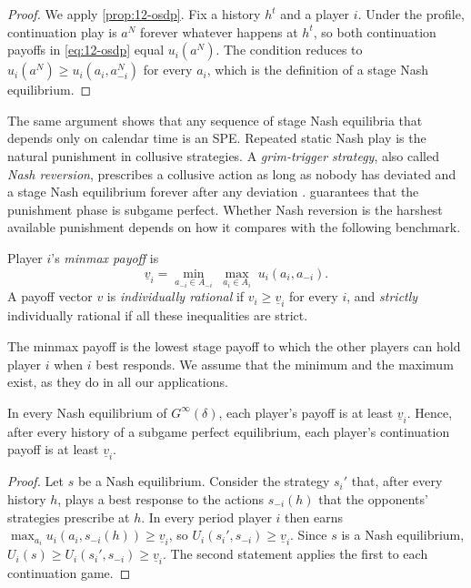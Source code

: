 \begin{proof}
We apply \cref{prop:12-osdp}. Fix a history $h^t$ and a player $i$. Under the profile, continuation play is $a^N$
forever whatever happens at $h^t$, so both continuation payoffs in \eqref{eq:12-osdp} equal $u_i(a^N)$. The condition
reduces to $u_i(a^N) \ge u_i(a_i, a_{-i}^N)$ for every $a_i$, which is the definition of a stage Nash equilibrium.
\end{proof}

The same argument shows that any sequence of stage Nash equilibria that depends only on calendar time is an SPE.
Repeated static Nash play is the natural punishment in collusive strategies. A \emph{grim-trigger strategy}, also
called \emph{Nash reversion}, prescribes a collusive action as long as nobody has deviated and a stage Nash
equilibrium forever after any deviation \citep{Friedman1971}.  guarantees that the
punishment phase is subgame perfect. Whether Nash reversion is the harshest available punishment depends on how it
compares with the following benchmark.

\begin{definition}\label{def:12-minmax}
Player $i$'s \emph{minmax payoff} is
\begin{equation}\label{eq:12-minmax}
\underline v_i = \min_{a_{-i} \in A_{-i}}\; \max_{a_i \in A_i}\; u_i(a_i, a_{-i}) .
\end{equation}
A payoff vector $v$ is \emph{individually rational} if $v_i \ge \underline v_i$ for every $i$, and \emph{strictly}
individually rational if all these inequalities are strict.
\end{definition}

The minmax payoff is the lowest stage payoff to which the other players can hold player $i$ when $i$ best responds.
We assume that the minimum and the maximum exist, as they do in all our applications.

\begin{lemma}\label{lem:12-ir}
In every Nash equilibrium of $G^\infty(\delta)$, each player's payoff is at least $\underline v_i$. Hence, after
every history of a subgame perfect equilibrium, each player's continuation payoff is at least $\underline v_i$.
\end{lemma}

\begin{proof}
Let $s$ be a Nash equilibrium. Consider the strategy $s_i'$ that, after every history $h$, plays a best response to
the actions $s_{-i}(h)$ that the opponents' strategies prescribe at $h$. In every period player $i$ then earns
$\max_{a_i}u_i(a_i, s_{-i}(h)) \ge \underline v_i$, so $U_i(s_i', s_{-i}) \ge \underline v_i$. Since $s$ is a Nash
equilibrium, $U_i(s) \ge U_i(s_i', s_{-i}) \ge \underline v_i$. The second statement applies the first to each
continuation game.
\end{proof}


